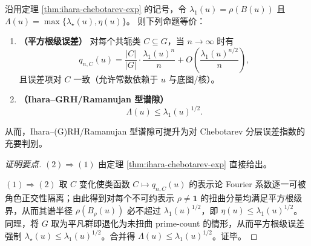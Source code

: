 \begin{corollary}\label{cor:ihara-chebotarev-grh-criterion}
沿用定理 \ref{thm:ihara-chebotarev-exp} 的记号，令
\(
\lambda_1(u)=\rho(B(u))
\)
且
\(
\Lambda(u)=\max\{\lambda_\star(u),\eta(u)\}
\)。
则下列命题等价：
\begin{enumerate}
  \item \textbf{（平方根级误差）}
  对每个共轭类 \(C\subseteq G\)，当 \(n\to\infty\) 时有
  \[
  q_{n,C}(u)=\frac{|C|}{|G|}\cdot\frac{\lambda_1(u)^n}{n}
  +O\!\left(\frac{\lambda_1(u)^{n/2}}{n}\right),
  \]
  且误差项对 \(C\) 一致（允许常数依赖于 \(u\) 与底图/核）。
  \item \textbf{（Ihara--GRH/Ramanujan 型谱隙）}
  \[
  \Lambda(u)\le \lambda_1(u)^{1/2}.
  \]
\end{enumerate}
从而，Ihara--(G)RH/Ramanujan 型谱隙可提升为对 Chebotarev 分层误差指数的充要判别。
\end{corollary}
\begin{proof}[证明要点]
\((2)\Rightarrow(1)\) 由定理 \ref{thm:ihara-chebotarev-exp} 直接给出。
\par
\((1)\Rightarrow(2)\) 取 \(C\) 变化使类函数 \(C\mapsto q_{n,C}(u)\) 的表示论 Fourier 系数逐一可被角色正交性隔离；由此得到对每个不可约表示 \(\rho\neq\mathbf 1\) 的扭曲分量均满足平方根级界，从而其谱半径 \(\rho(B_\rho(u))\) 必不超过 \(\lambda_1(u)^{1/2}\)，即 \(\eta(u)\le\lambda_1(u)^{1/2}\)。同理，将 \(G\) 取为平凡群即退化为未扭曲 prime-count 的情形，从而平方根级误差强制 \(\lambda_\star(u)\le\lambda_1(u)^{1/2}\)。合并得 \(\Lambda(u)\le\lambda_1(u)^{1/2}\)。证毕。
\end{proof}

\endinput
